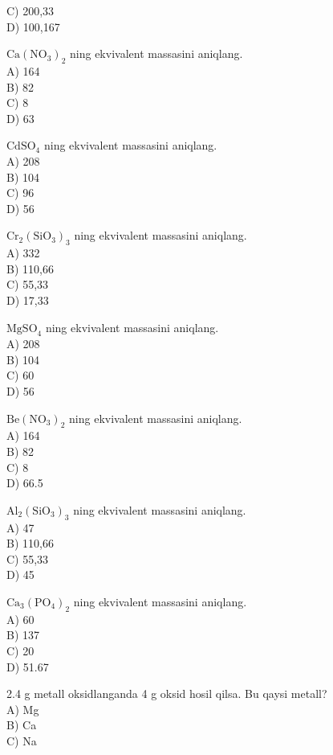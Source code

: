 C) 200,33\\
D) 100,167
  \item $\mathrm{Ca}\left(\mathrm{NO}_{3}\right)_{2}$ ning ekvivalent massasini aniqlang.\\
A) 164\\
B) 82\\
C) 8\\
D) 63
  \item $\mathrm{CdSO}_{4}$ ning ekvivalent massasini aniqlang.\\
A) 208\\
B) 104\\
C) 96\\
D) 56
  \item $\mathrm{Cr}_{2}\left(\mathrm{SiO}_{3}\right)_{3}$ ning ekvivalent massasini aniqlang.\\
A) 332\\
B) 110,66\\
C) 55,33\\
D) 17,33
  \item $\mathrm{MgSO}_{4}$ ning ekvivalent massasini aniqlang.\\
A) 208\\
B) 104\\
C) 60\\
D) 56
  \item $\mathrm{Be}\left(\mathrm{NO}_{3}\right)_{2}$ ning ekvivalent massasini aniqlang.\\
A) 164\\
B) 82\\
C) 8\\
D) 66.5
  \item $\mathrm{Al}_{2}\left(\mathrm{SiO}_{3}\right)_{3}$ ning ekvivalent massasini aniqlang.\\
A) 47\\
B) 110,66\\
C) 55,33\\
D) 45
  \item $\mathrm{Ca}_{3}\left(\mathrm{PO}_{4}\right)_{2}$ ning ekvivalent massasini aniqlang.\\
A) 60\\
B) 137\\
C) 20\\
D) 51.67
  \item 2.4 g metall oksidlanganda 4 g oksid hosil qilsa. Bu qaysi metall?\\
A) Mg\\
B) Ca\\
C) Na\\

